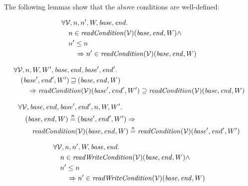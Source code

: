 \documentclass{article}
\newcommand{\nequal}[1][n]{\stackrel{\tiny{#1}}{=}}
\newcommand{\var}[1]{\mathit{#1}}
\newcommand{\start}{\var{base}}
\newcommand{\addrend}{\var{end}}
\newcommand{\plainfun}[2]{
  \ifthenelse{\equal{#2}{}}
             {\mathit{#1}}
             {\mathit{#1}(#2)}
}
\newcommand{\readCond}[1]{\plainfun{readCondition}{#1}}
\newcommand{\writeCond}[1]{\plainfun{readWriteCondition}{#1}}
\newcommand{\future}{\mathbin{\sqsupseteq}}
\newcommand{\asmType}{\plaindom{AsmType}}
\newcommand{\plaindom}[1]{\mathrm{#1}}
\newcommand{\intr}[2]{\mathcal{#1}}
\newcommand{\valueintr}[1]{\intr{V}{#1}}
\newcommand{\stdvr}{\valueintr{\asmType}}
\begin{document}
The following lemmas show that the above conditions are well-defined:
\begin{lemma}
\label{lem:rc-dc}
  \begin{align*}
    &\forall \stdvr, n,n',W,\start, \addrend \ldotp \\
    &\quad  n \in \readCond{}(\stdvr)(\start,\addrend,W) \land \\
    &\quad  n' \leq n \\
    &\qquad \Rightarrow n' \in \readCond{}(\stdvr)(\start,\addrend,W)
  \end{align*}
\end{lemma}

\begin{lemma}
\label{lem:rc-mono-world}
  \begin{align*}
    &\forall \stdvr, n,W,W',\start, \addrend, \start',\addrend' \ldotp \\
    &\quad  (\start',\addrend',W') \future (\start,\addrend,W) \\
    &\qquad \Rightarrow \readCond{}(\stdvr)(\start',\addrend',W') \supseteq \readCond{}(\stdvr)(\start,\addrend,W)
  \end{align*}
\end{lemma}

\begin{lemma}
\label{lem:rc-ne-world}
  \begin{align*}
    & \forall \stdvr, \start, \addrend, \start', \addrend', n, W, W' \ldotp \\
    & \quad (\start, \addrend,W) \nequal (\start', \addrend',W') \Rightarrow \\
    & \qquad \readCond{}(\stdvr)(\start, \addrend,W) \nequal \readCond{}(\stdvr)(\start', \addrend',W')\\
  \end{align*}
\end{lemma}

\begin{lemma}
\label{lem:wc-dc}
  \begin{align*}
    &\forall \stdvr, n,n',W,\start, \addrend \ldotp \\
    &\quad  n \in \writeCond{}(\stdvr)(\start,\addrend,W) \land \\
    &\quad  n' \leq n \\
    &\qquad \Rightarrow n' \in \writeCond{}(\stdvr)(\start,\addrend,W)
  \end{align*}
\end{lemma}
\end{document}
